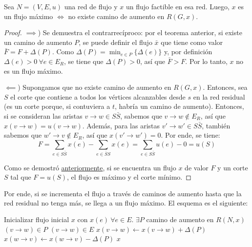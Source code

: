 \begin{theorem*}
    Sea $N = (V, E, u)$ una red de flujo y $x$ un flujo factible en esa red. Luego, $x$ es un flujo máximo $\iff$ no existe camino de aumento en $R(G, x)$.
\end{theorem*}
\begin{proof}
    \leavevmode

    $\implies$) Se demuestra el contrarrecíproco: por el teorema anterior, si existe un camino de aumento $P$, se puede definir el flujo $\bar{x}$ que tiene como valor $\bar{F} = F + \Delta(P)$. Como $\Delta(P) = \min_{e \in P}{\{\Delta(e)\}}$ y, por definición $\Delta(e) > 0\ \forall e \in E_R$, se tiene que $\Delta(P) > 0$, así que $\bar{F} > F$. Por lo tanto, $x$ no es un flujo máximo.

    $\impliedby$) Supongamos que no existe camino de aumento en $R(G, x)$. Entonces, sea $S$ el corte que contiene a todos los vértices alcanzables desde $s$ en la red residual (es un corte porque, si contuviera a $t$, habría un camino de aumento). Entonces, si se consideran las aristas $v \rightarrow w \in S\bar{S}$, sabemos que $v \rightarrow w \notin E_R$, así que $x(v \rightarrow w) = u(v \rightarrow w)$. Además, para las aristas $v' \rightarrow w' \in S\bar{S}$, también sabemos que $w' \rightarrow v \notin E_R$, así que $x(v' \rightarrow w') = 0$. Por ende, se tiene:
    $$F = \sum_{e \in S\bar{S}} x(e) - \sum_{e \in \bar{S}S} x(e) = \sum_{e \in S\bar{S}} u(e) - 0 = u(S)$$

    Como se demostró \hyperref[flujo-certificado-optimalidad]{anteriormente}, si se encuentra un flujo $x$ de valor $F$ y un corte $S$ tal que $F = u(S)$, el flujo es máximo y el corte mínimo.

\end{proof}

Por ende, si se incrementa el flujo a través de caminos de aumento hasta que la red residual no tenga más, se llega a un flujo máximo. El esquema es el siguiente:

\begin{codebox}
        \li Inicializar flujo inicial $x$ con $x(e)\ \forall e \in E$.
        \li \While $\exists P$ camino de aumento en $R(N, x)$ \Do
        \li \For \Each $(v \rightarrow w) \in P$ \Do
        \li \If $(v \rightarrow w) \in E$ \Then
        \li $x(v \rightarrow w) \gets x(v \rightarrow w) + \Delta(P)$
        \li \Else
        \li $x(w \rightarrow v) \gets x(w \rightarrow v) - \Delta(P)$
        \End
        \End
        \End
        \li \Return $x$
\end{codebox}

